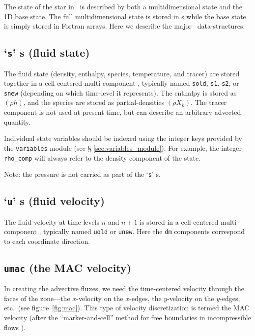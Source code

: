 The state of the star in \maestro\ is described by both a
multidimensional state and the 1D base state.  The full
multidimensional state is stored in \multifab s while the base state
is simply stored in Fortran arrays.  Here we describe the
major \maestro\ data-structures.




\subsection{`{\tt s}' \multifab s (fluid state)}

The fluid state (density, enthalpy, species, temperature, and tracer)
are stored together in a cell-centered multi-component \multifab,
typically named {\tt sold}, {\tt s1}, {\tt s2}, or {\tt snew}
(depending on which time-level it represents).  The enthalpy is stored
as $(\rho h)$, and the species are stored as partial-densities $(\rho
X_k)$.  The tracer component is not used at present time, but can
describe an arbitrary advected quantity.

Individual state variables should be indexed using the integer keys
provided by the {\tt variables} module (see \S
\ref{sec:variables_module}).  For example, the integer {\tt rho\_comp}
will always refer to the density component of the state.

Note: the pressure is not carried as part of the `{\tt s}' \multifab s.


\subsection{`{\tt u}' \multifab s (fluid velocity)}

The fluid velocity at time-levels $n$ and $n+1$ is stored in
a cell-centered multi-component \multifab, typically named
{\tt uold} or {\tt unew}.  Here the {\tt dm}
components correspond to each coordinate direction.

\subsection{{\tt umac} (the MAC velocity)}

In creating the advective fluxes, we need the time-centered velocity
through the faces of the zone---the $x$-velocity on the $x$-edges, the
$y$-velocity on the $y$-edges, etc.\ (see figure~\ref{fig:mac}).  This
type of velocity discretization is termed the MAC velocity (after the
``marker-and-cell'' method for free boundaries in incompressible
flows \cite{harlowwelch:1965}).



